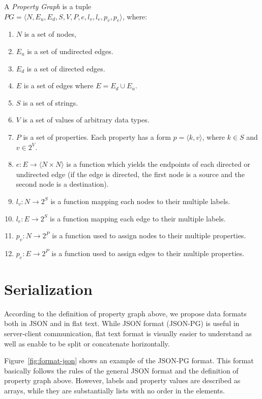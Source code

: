 \documentclass[runningheads]{llncs}
\begin{document}
\begin{defi}

A \emph{Property Graph} is a tuple  \\ 
$PG = \langle N, E_u, E_d, S, V, P, e, l_v, l_e, p_v, p_e\rangle$, where:
\begin{enumerate}
    \item $N$ is a set of nodes,
    \item $E_u$ is a set of undirected edges.
    \item $E_d$ is a set of directed edges.
    \item $E$ is a set of edges where $E = E_d \cup E_u$.
    \item $S$ is a set of strings.
    \item $V$ is a set of values of arbitrary data types.
    \item $P$ is a set of properties. Each property has a form $p = \langle k,v \rangle$, where $k \in S$ and $v \in 2^V$.
    \item $e: E \to \langle N \times N \rangle$ is a function which yields the endpoints of each directed or undirected edge (if the edge is directed, the first node is a source and the second node is a destination).
    \item $l_v : N \to 2^S$ is a function mapping each nodes to their multiple labels.
    \item $l_e : E \to 2^S$ is a function mapping each edge to their multiple labels.
    \item $p_v : N \to 2^P$ is a function used to assign nodes to their multiple properties.
    \item $p_e : E \to 2^P$ is a function used to assign edges to their multiple properties.
\end{enumerate}
\end{defi}


\section{Serialization}
According to the definition of property graph above, we propose data formats both in JSON and in flat text. While JSON format (JSON-PG) is useful in server-client communication, flat text format is visually easier to understand as well as enable to be split or concatenate horizontally.

Figure~\ref{fig:format-json} shows an example of the JSON-PG format. This format basically follows the rules of the general JSON format and the definition of property graph above. However, labels and property values are described as arrays, while they are substantially lists with no order in the elements.  
\end{document}
